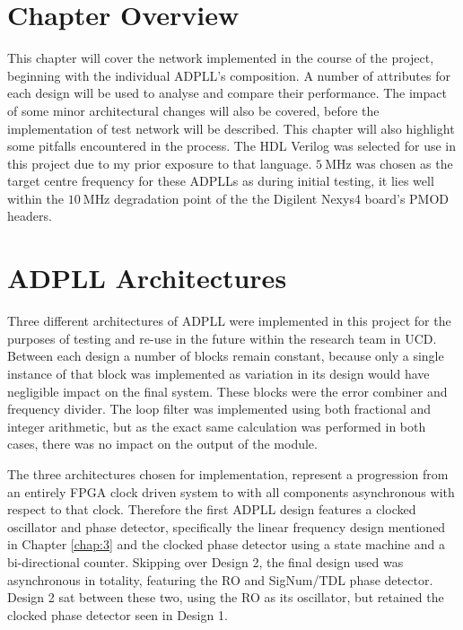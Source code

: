 \section{Chapter Overview}
This chapter will cover the network implemented in the course of the project, beginning with the individual \ac{ADPLL}'s composition. A number of attributes for each design will be used to analyse and compare their performance. The impact of some minor architectural changes will also be covered, before the implementation of test network will be described. This chapter will also highlight some pitfalls encountered in the process. The \ac{HDL} Verilog was selected for use in this project due to my prior exposure to that language. $5~\si{\mega\hertz}$ was chosen as the target centre frequency for these \acp{ADPLL} as during initial testing, it lies well within the $10~\si{\mega\hertz}$ degradation point of the the Digilent Nexys4 board's \ac{PMOD} headers.

\section{\acs{ADPLL} Architectures}
Three different architectures of \ac{ADPLL} were implemented in this project for the purposes of testing and re-use in the future within the research team in \acl{UCD}. Between each design a number of blocks remain constant, because only a single instance of that block was implemented as variation in its design would have negligible impact on the final system. These blocks were the error combiner and frequency divider. The loop filter was implemented using both fractional and integer arithmetic, but as the exact same calculation was performed in both cases, there was no impact on the output of the module.

The three architectures chosen for implementation, represent a progression from an entirely \ac{FPGA} clock driven system to  with all components asynchronous with respect to that clock. Therefore the first \ac{ADPLL} design features a clocked oscillator and phase detector, specifically the linear frequency design mentioned in Chapter \ref{chap:3} and the clocked phase detector using a state machine and a bi-directional counter. Skipping over Design 2, the final design used was asynchronous in totality, featuring the \acl{RO} and SigNum/\ac{TDL} phase detector. Design 2 sat between these two, using the \ac{RO} as its oscillator, but retained the clocked phase detector seen in Design 1.


